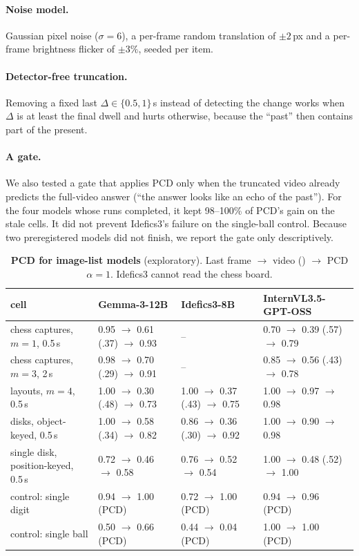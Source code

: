 \paragraph{Noise model.} Gaussian pixel noise ($\sigma=6$), a per-frame random translation of $\pm2$\,px and a per-frame brightness flicker of $\pm3\%$, seeded per item.

\paragraph{Detector-free truncation.} Removing a fixed last $\Delta\in\{0.5,1\}$\,s instead of detecting the change works when $\Delta$ is at least the final dwell and hurts otherwise, because the ``past'' then contains part of the present.

\paragraph{A gate.} We also tested a gate that applies PCD only when the truncated video already predicts the full-video answer (``the answer looks like an echo of the past''). For the four models whose runs completed, it kept 98--100\% of PCD's gain on the stale cells. It did not prevent Idefics3's failure on the single-ball control. Because two preregistered models did not finish, we report the gate only descriptively.

\begin{table}[h]
  \centering
  \small
  \caption{\textbf{PCD for image-list models} (exploratory). Last frame $\to$ video (\pstale) $\to$ PCD $\alpha=1$. Idefics3 cannot read the chess board.}
  \label{tab:nonqwen}
  \begin{tabular}{llll}
    \toprule
    cell & Gemma-3-12B & Idefics3-8B & InternVL3.5-GPT-OSS \\
    \midrule
    chess captures, $m=1$, 0.5\,s & 0.95 $\to$ 0.61 (.37) $\to$ 0.93 & -- & 0.70 $\to$ 0.39 (.57) $\to$ 0.79 \\
    chess captures, $m=3$, 2\,s & 0.98 $\to$ 0.70 (.29) $\to$ 0.91 & -- & 0.85 $\to$ 0.56 (.43) $\to$ 0.78 \\
    layouts, $m=4$, 0.5\,s & 1.00 $\to$ 0.30 (.48) $\to$ 0.73 & 1.00 $\to$ 0.37 (.43) $\to$ 0.75 & 1.00 $\to$ 0.97 $\to$ 0.98 \\
    disks, object-keyed, 0.5\,s & 1.00 $\to$ 0.58 (.34) $\to$ 0.82 & 0.86 $\to$ 0.36 (.30) $\to$ 0.92 & 1.00 $\to$ 0.90 $\to$ 0.98 \\
    single disk, position-keyed, 0.5\,s & 0.72 $\to$ 0.46 $\to$ 0.58 & 0.76 $\to$ 0.52 $\to$ 0.54 & 1.00 $\to$ 0.48 (.52) $\to$ 1.00 \\
    control: single digit & 0.94 $\to$ 1.00 (PCD) & 0.72 $\to$ 1.00 (PCD) & 0.94 $\to$ 0.96 (PCD) \\
    control: single ball & 0.50 $\to$ 0.66 (PCD) & 0.44 $\to$ 0.04 (PCD) & 1.00 $\to$ 1.00 (PCD) \\
    \bottomrule
  \end{tabular}
\end{table}

